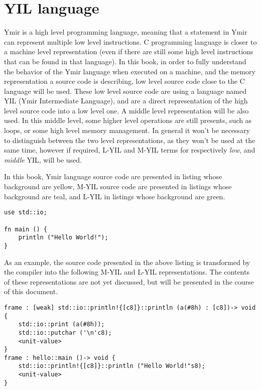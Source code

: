\section{YIL language}

Ymir is a high level programming language, meaning that a statement in Ymir can
represent multiple low level instructions. C programming language is closer to a
machine level representation (even if there are still some high level
instructions that can be found in that language). In this book, in order to
fully understand the behavior of the Ymir language when executed on a machine,
and the memory representation a source code is describing, low level source code
close to the C language will be used. These low level source code are using a
language named YIL (Ymir Intermediate Language), and are a direct representation
of the high level source code into a low level one. A middle level
representation will be also used. In this middle level, some higher level
operations are still presents, such as loops, or some high level memory
management. In general it won't be necessary to distinguish between the two
level representations, as they won't be used at the same time, however if
required, L-YIL and M-YIL terms for respectively \textit{low}, and
\textit{middle} YIL, will be used.

In this book, Ymir language source code are presented in listing whose
background are yellow, M-YIL source code are presented in listings whose
background are teal, and L-YIL in listings whose background are green.

\begin{lstlisting}[style=coloredverbatim, caption=Source file \textit{hello.yr}, label=lst:hello_world]
use std::io;

fn main () {
    println ("Hello World!");
}
\end{lstlisting}

As an example, the source code presented in the above listing is transformed by
the compiler into the following M-YIL and L-YIL representations. The contents of
these representations are not yet discussed, but will be presented in the course
of this document.

\begin{lstlisting}[style=myilVerb, caption=M-YIL reprensentation of \textit{hello.yr}]
frame : [weak] std::io::println!{[c8]}::println (a(#8h) : [c8])-> void {
    std::io::print (a(#8h));
    std::io::putchar ('\n'c8);
    <unit-value>
}
frame : hello::main ()-> void {
    std::io::println!{[c8]}::println ("Hello World!"s8);
    <unit-value>
}
\end{lstlisting}

